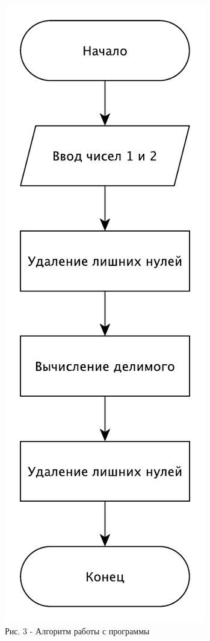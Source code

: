 \documentclass[a4paper,14pt]{article} %
\begin{document}
	\begin{center}
        		\includegraphics[scale = 0.53]{shema1} \\ Рис. 3 - Алгоритм работы с программы
	\end{center}
        	
\end{document}
